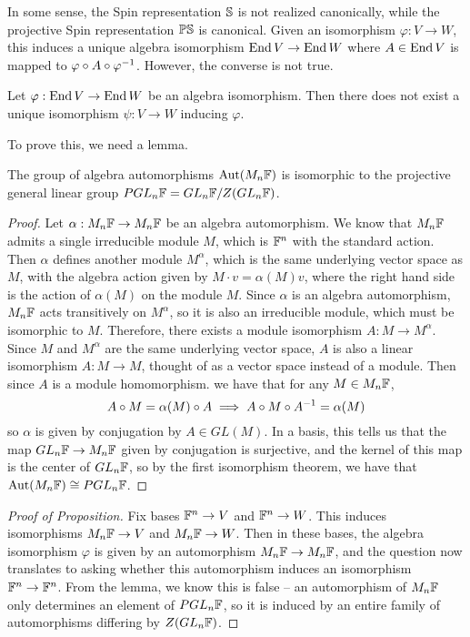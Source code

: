 In some sense, the Spin representation $\S$ is not realized canonically,
while the projective Spin representation $\P\S$ is canonical. Given
an isomorphism $\varphi : V \to W$, this induces a unique algebra isomorphism
$\End V \to \End W$ where $A \in \End V$ is mapped to
$\varphi \circ A \circ \varphi\inv$. However, the converse is not true.
%
\begin{prop}
Let $\varphi : \End V \to \End W$ be an algebra isomorphism. Then there does
not exist a unique isomorphism $\psi : V \to W$ inducing $\varphi$.
\end{prop}
%
To prove this, we need a lemma.
%
\begin{lem}
The group of algebra automorphisms $\Aut(M_n\F)$ is isomorphic to the
projective general linear group $PGL_n\F = GL_n\F / Z(GL_n\F)$.
\end{lem}
%
\begin{proof}
Let $\alpha : M_n\F \to M_n\F$ be an algebra automorphism. We know that
$M_n\F$ admits a single irreducible module $M$, which is $\F^n$ with the
standard action. Then $\alpha$ defines another module $M^\alpha$, which
is the same underlying vector space as $M$, with the algebra action given
by $M \cdot v = \alpha(M)v$, where the right hand side is the action of
$\alpha(M)$ on the module $M$. Since $\alpha$ is an algebra automorphism,
$M_n\F$ acts transitively on $M^\alpha$, so it is also an irreducible module,
which must be isomorphic to $M$. Therefore, there exists a module isomorphism
$A : M \to M^\alpha$. Since $M$ and $M^\alpha$ are the same underlying vector
space, $A$ is also a linear isomorphism $A : M \to M$, thought of as a vector space
instead of a module. Then since $A$ is a module homomorphism. we have that
for any $M \in M_n\F$,
\[
A \circ M = \alpha(M) \circ A \implies A \circ M \circ A\inv = \alpha(M)
\]
so $\alpha$ is given by conjugation by $A \in GL(M)$. In a basis, this
tells us that the map $GL_n\F \to M_n\F$ given by conjugation is surjective,
and the kernel of this map is the center of $GL_n\F$, so by the first isomorphism
theorem, we have that $\Aut(M_n\F) \cong PGL_n\F$.
\end{proof}
%
\begin{proof}[Proof of Proposition]
Fix bases $\F^n \to V$ and $\F^n \to W$. This induces isomorphisms
$M_n\F \to V$ and $M_n\F \to W$. Then in these bases, the algebra
isomorphism $\varphi$ is given by an automorphism $M_n\F \to M_n\F$, and
the question now translates to asking whether this automorphism induces
an isomorphism $\F^n \to \F^n$. From the lemma, we know this is false -- an
automorphism of $M_n\F$ only determines an element of $PGL_n\F$, so it
is induced by an entire family of automorphisms differing by $Z(GL_n\F)$.
\end{proof}

